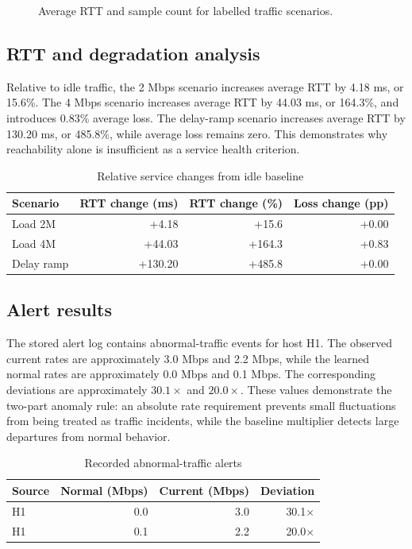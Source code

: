\documentclass[conference]{IEEEtran}
\begin{document}
\begin{figure}[t]
\centering

\caption{Average RTT and sample count for labelled traffic scenarios.}
\label{fig:labelled}
\end{figure}

\subsection{RTT and degradation analysis}

Relative to idle traffic, the 2 Mbps scenario increases average RTT by
4.18 ms, or 15.6\%. The 4 Mbps scenario increases average RTT by 44.03 ms,
or 164.3\%, and introduces 0.83\% average loss. The delay-ramp scenario
increases average RTT by 130.20 ms, or 485.8\%, while average loss remains
zero. This demonstrates why reachability alone is insufficient as a service
health criterion.

\begin{table}[t]
\centering
\caption{Relative service changes from idle baseline}
\label{tab:relative}
\begin{tabular}{lrrr}
\toprule
Scenario & RTT change (ms) & RTT change (\%) & Loss change (pp)\\
\midrule
Load 2M & +4.18 & +15.6 & +0.00\\
Load 4M & +44.03 & +164.3 & +0.83\\
Delay ramp & +130.20 & +485.8 & +0.00\\
\bottomrule
\end{tabular}
\end{table}

\subsection{Alert results}

The stored alert log contains abnormal-traffic events for host H1. The
observed current rates are approximately 3.0 Mbps and 2.2 Mbps, while the
learned normal rates are approximately 0.0 Mbps and 0.1 Mbps. The corresponding
deviations are approximately $30.1\times$ and $20.0\times$. These values
demonstrate the two-part anomaly rule: an absolute rate requirement prevents
small fluctuations from being treated as traffic incidents, while the
baseline multiplier detects large departures from normal behavior.

\begin{table}[t]
\centering
\caption{Recorded abnormal-traffic alerts}
\label{tab:alerts}
\begin{tabular}{lrrr}
\toprule
Source & Normal (Mbps) & Current (Mbps) & Deviation\\
\midrule
H1 & 0.0 & 3.0 & 30.1$\times$\\
H1 & 0.1 & 2.2 & 20.0$\times$\\
\bottomrule
\end{tabular}
\end{table}
\end{document}
